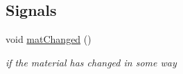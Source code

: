 \subsection*{Signals}
\begin{DoxyCompactItemize}
\item 
\hypertarget{class_abstract_material_widget_a57872e797feedc126fc15823c5b6d8e2}{void \hyperlink{class_abstract_material_widget_a57872e797feedc126fc15823c5b6d8e2}{mat\-Changed} ()}\label{class_abstract_material_widget_a57872e797feedc126fc15823c5b6d8e2}

\begin{DoxyCompactList}\small\item\em if the material has changed in some way \end{DoxyCompactList}\end{DoxyCompactItemize}
